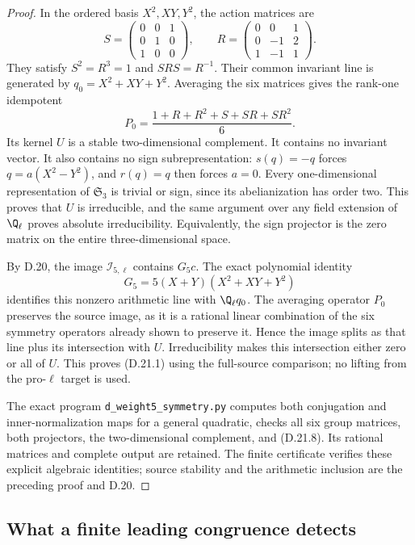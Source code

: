 \begin{proof}
In the ordered basis $X^2,XY,Y^2$, the action matrices are
\[
 S=\begin{pmatrix}0&0&1\\0&1&0\\1&0&0\end{pmatrix},
 \qquad
 R=\begin{pmatrix}0&0&1\\0&-1&2\\1&-1&1\end{pmatrix}.
 \tag{D.21.6}
\]
They satisfy $S^2=R^3=1$ and $SRS=R^{-1}$.
Their common invariant line is generated by
$q_0=X^2+XY+Y^2$. Averaging the six matrices gives the
rank-one idempotent
\[
       P_0=\frac{1+R+R^2+S+SR+SR^2}{6}.
       \tag{D.21.7}
\]
Its kernel $U$ is a stable two-dimensional complement.
It contains no invariant vector. It also contains no
sign subrepresentation: $s(q)=-q$ forces
$q=a(X^2-Y^2)$, and $r(q)=q$ then forces $a=0$.
Every one-dimensional representation of $\mathfrak S_3$
is trivial or sign, since its abelianization has order two.
This proves that $U$ is irreducible, and the same argument
over any field extension of $\Q_\ell$ proves absolute
irreducibility. Equivalently, the sign projector is the
zero matrix on the entire three-dimensional space.

By D.20, the image $\mathscr I_{5,\ell}$ contains $G_5c$.
The exact polynomial identity
\[
           G_5=5(X+Y)(X^2+XY+Y^2)
           \tag{D.21.8}
\]
identifies this nonzero arithmetic line with $\Q_\ell q_0$.
The averaging operator $P_0$ preserves the source image,
as it is a rational linear combination of the six symmetry
operators already shown to preserve it. Hence the image
splits as that line plus its intersection with $U$.
Irreducibility makes this intersection either zero or all
of $U$. This proves (D.21.1) using the full-source
comparison; no lifting from the pro-$\ell$ target is used.

The exact program \texttt{d\_weight5\_symmetry.py} computes
both conjugation and inner-normalization maps for a general
quadratic, checks all six group matrices, both projectors,
the two-dimensional complement, and (D.21.8). Its rational
matrices and complete output are retained. The finite
certificate verifies these explicit algebraic identities;
source stability and the arithmetic inclusion are the
preceding proof and D.20.
\end{proof}

\subsection{What a finite leading congruence detects}


